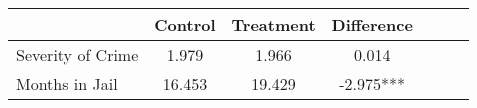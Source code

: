 \begin{tabular}{l*{6}{c}}
                    &     Control&   Treatment&  Difference   \\
\hline
Severity of Crime   &       1.979&       1.966&       0.014   \\
Months in Jail      &      16.453&      19.429&      -2.975***\\
\end{tabular}
